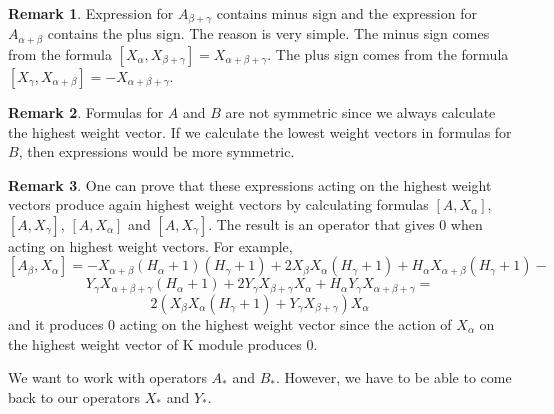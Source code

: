\documentclass[twoside,a4paper,12pt]{article}
\theoremstyle{definition}
\newtheorem{remark}{Remark}
\begin{document}
\begin{remark}
	Expression for $A_{\beta+\gamma}$ contains minus sign and the expression for
	$A_{\alpha+\beta}$ contains the plus sign. The reason is very simple.
	The minus sign comes from the formula
	$[X_\alpha,X_{\beta+\gamma}]=X_{\alpha+\beta+\gamma}$.
	The plus sign comes from the formula
	$[X_\gamma,X_{\alpha+\beta}]=-X_{\alpha+\beta+\gamma}$.
\end{remark}

\begin{remark}
	Formulas for $A$ and $B$ are not symmetric since we always
	calculate the highest weight vector. If we calculate the
	lowest weight vectors in formulas for $B$, then expressions would
	be more symmetric.
\end{remark}

\begin{remark}\label{remhigh}
	One can prove that these expressions acting on the highest weight vectors
	produce again highest weight vectors by calculating formulas $[A,X_\alpha]$,
	$[A,X_\gamma]$, $[A,X_\alpha]$ and $[A,X_\gamma]$. The result is an
	operator that gives 0 when acting on highest weight vectors. For example,
	\[ [A_\beta,X_\alpha]=-X_{\alpha+\beta}(H_\alpha+1)(H_\gamma+1)+
		2X_\beta X_\alpha(H_\gamma+1)+
		H_\alpha X_{\alpha+\beta}(H_\gamma+1)- \]
	\[ Y_\gamma X_{\alpha+\beta+\gamma}(H_\alpha+1)+
		2Y_\gamma X_{\beta+\gamma}X_\alpha+
		H_\alpha Y_\gamma X_{\alpha+\beta+\gamma}= \]
	\[ 2(X_\beta X_\alpha(H_\gamma+1)+Y_\gamma X_{\beta+\gamma})
		X_\alpha \]
	and it produces 0 acting on the highest weight vector since the action of
	$X_\alpha$ on the highest weight vector of K module produces 0.
\end{remark}

We want to work with operators $A_*$ and $B_*$. However, we have to be able to
come back to our operators $X_*$ and $Y_*$.
\end{document}
